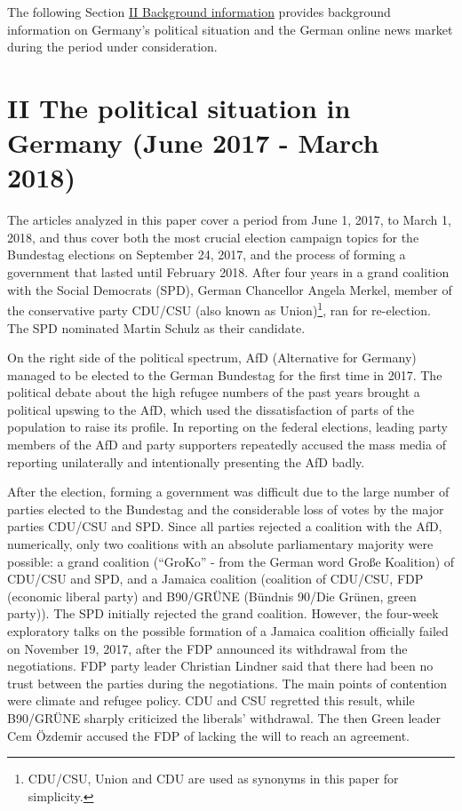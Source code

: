 \documentclass[
  12pt,
]{article}
\begin{document}
The following Section \protect\hyperlink{ii-background-information}{II
Background information} provides background information on Germany's
political situation and the German online news market during the period
under consideration.

\hypertarget{ii-the-political-situation-in-germany-june-2017---march-2018}{%
\section{II The political situation in Germany (June 2017 - March
2018)}\label{ii-the-political-situation-in-germany-june-2017---march-2018}}

The articles analyzed in this paper cover a period from June 1, 2017, to
March 1, 2018, and thus cover both the most crucial election campaign
topics for the Bundestag elections on September 24, 2017, and the
process of forming a government that lasted until February 2018. After
four years in a grand coalition with the Social Democrats (SPD), German
Chancellor Angela Merkel, member of the conservative party CDU/CSU (also
known as Union)\footnote{CDU/CSU, Union and CDU are used as synonyms in
  this paper for simplicity.}, ran for re-election. The SPD nominated
Martin Schulz as their candidate.

On the right side of the political spectrum, AfD (Alternative for
Germany) managed to be elected to the German Bundestag for the first
time in 2017. The political debate about the high refugee numbers of the
past years brought a political upswing to the AfD, which used the
dissatisfaction of parts of the population to raise its profile. In
reporting on the federal elections, leading party members of the AfD and
party supporters repeatedly accused the mass media of reporting
unilaterally and intentionally presenting the AfD badly.

After the election, forming a government was difficult due to the large
number of parties elected to the Bundestag and the considerable loss of
votes by the major parties CDU/CSU and SPD. Since all parties rejected a
coalition with the AfD, numerically, only two coalitions with an
absolute parliamentary majority were possible: a grand coalition
(``GroKo'' - from the German word Große Koalition) of CDU/CSU and SPD,
and a Jamaica coalition (coalition of CDU/CSU, FDP (economic liberal
party) and B90/GRÜNE (Bündnis 90/Die Grünen, green party)). The SPD
initially rejected the grand coalition. However, the four-week
exploratory talks on the possible formation of a Jamaica coalition
officially failed on November 19, 2017, after the FDP announced its
withdrawal from the negotiations. FDP party leader Christian Lindner
said that there had been no trust between the parties during the
negotiations. The main points of contention were climate and refugee
policy. CDU and CSU regretted this result, while B90/GRÜNE sharply
criticized the liberals' withdrawal. The then Green leader Cem Özdemir
accused the FDP of lacking the will to reach an agreement.
\end{document}
